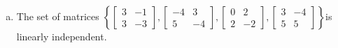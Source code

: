 \begin{exerciseAnswer}
\begin{enumerate}[(a)]
\item The set of matrices \( \left\{ \left[\begin{array}{cc}
3 & -1 \\
3 & -3
\end{array}\right] , \left[\begin{array}{cc}
-4 & 3 \\
5 & -4
\end{array}\right] , \left[\begin{array}{cc}
0 & 2 \\
2 & -2
\end{array}\right] , \left[\begin{array}{cc}
3 & -4 \\
5 & 5
\end{array}\right] \right\} \)is linearly independent.
\end{enumerate}
    
\end{exerciseAnswer}
    

